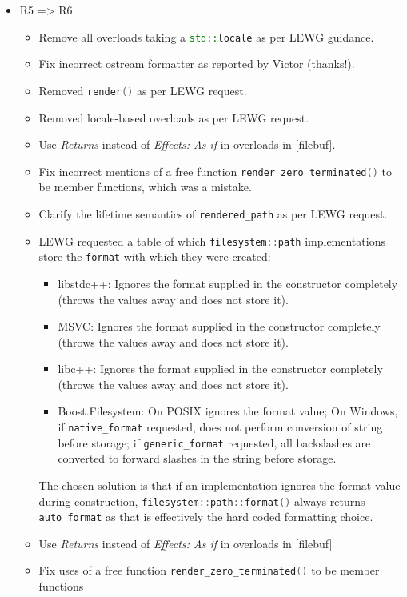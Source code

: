 \documentclass[11pt]{article}
\newcommand{\code}[2][cpp]{\lstinline[language=#1,basicstyle=\small\ttfamily]{#2}}
\begin{document}
\begin{itemize}
    \item R5 => R6:
    \begin{itemize}
    \item Remove all overloads taking a \code{std::locale} as per LEWG guidance.
    \item Fix incorrect ostream formatter as reported by Victor (thanks^^21). 
    \item Removed \code{render()} as per LEWG request.
    \item Removed locale-based overloads as per LEWG request.
    \item Use \emph{Returns} instead of \emph{Effects: As if} in overloads in [filebuf].
    \item Fix incorrect mentions of a free function \code{render_zero_terminated()} to be member functions, which was a mistake.
    \item Clarify the lifetime semantics of \code{rendered_path} as per LEWG request.
    \item LEWG requested a table of which \code{filesystem::path} implementations store the \code{format} with which they were created:
    \begin{itemize}
      \item libstdc++: Ignores the format supplied in the constructor completely
      (throws the values away and does not store it).
      \item MSVC: Ignores the format supplied in the constructor completely
      (throws the values away and does not store it).
      \item libc++: Ignores the format supplied in the constructor completely
      (throws the values away and does not store it).
      \item Boost.Filesystem: On POSIX ignores the format value; On Windows, if \code{native_format} requested, does not perform conversion of string before storage; if \code{generic_format} requested, all backslashes are converted to forward slashes in the string before storage.
    \end{itemize}
    The chosen solution is that if an implementation ignores the format value during construction, \code{filesystem::path::format()} always
    returns \code{auto_format} as that is effectively the hard coded formatting choice.
    \item Use \emph{Returns} instead of \emph{Effects: As if} in overloads in [filebuf]
    \item Fix uses of a free function \code{render_zero_terminated()} to be member functions

\end{itemize}
\end{itemize}
\end{document}
